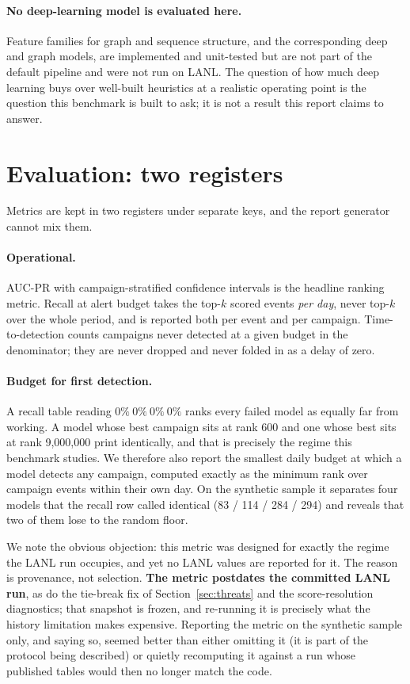 \documentclass[11pt,a4paper]{article}
\begin{document}
\paragraph{No deep-learning model is evaluated here.} Feature families for graph
and sequence structure, and the corresponding deep and graph models, are
implemented and unit-tested but are not part of the default pipeline and were not
run on LANL. The question of how much deep learning buys over well-built
heuristics at a realistic operating point is the question this benchmark is
built to ask; it is not a result this report claims to answer.

\section{Evaluation: two registers}

Metrics are kept in two registers under separate keys, and the report generator
cannot mix them.

\paragraph{Operational.} AUC-PR with campaign-stratified confidence intervals is
the headline ranking metric. Recall at alert budget takes the top-$k$ scored
events \emph{per day}, never top-$k$ over the whole period, and is reported both
per event and per campaign. Time-to-detection counts campaigns never detected at
a given budget in the denominator; they are never dropped and never folded in as
a delay of zero.

\paragraph{Budget for first detection.} A recall table reading $0\%\ 0\%\ 0\%\
0\%$ ranks every failed model as equally far from working. A model whose best
campaign sits at rank 600 and one whose best sits at rank 9{,}000{,}000 print
identically, and that is precisely the regime this benchmark studies. We
therefore also report the smallest daily budget at which a model detects any
campaign, computed exactly as the minimum rank over campaign events within their
own day. On the synthetic sample it separates four models that the recall row
called identical (83 / 114 / 284 / 294) and reveals that two of them lose to the
random floor.

We note the obvious objection: this metric was designed for exactly the regime
the LANL run occupies, and yet no LANL values are reported for it. The reason is
provenance, not selection. \textbf{The metric postdates the committed LANL run},
as do the tie-break fix of Section~\ref{sec:threats} and the score-resolution
diagnostics; that snapshot is frozen, and re-running it is precisely what the
history limitation makes expensive. Reporting the metric on the synthetic sample
only, and saying so, seemed better than either omitting it (it is part of the
protocol being described) or quietly recomputing it against a run whose
published tables would then no longer match the code.
\end{document}

